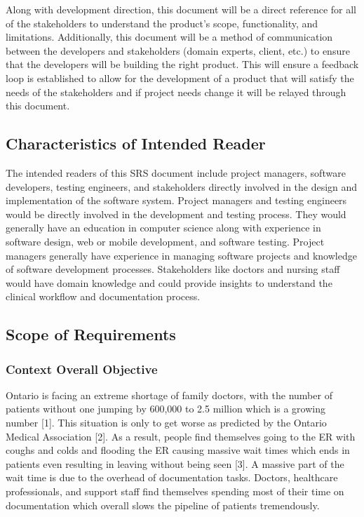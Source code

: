 \documentclass[12pt]{article}
\begin{document}
  Along with development direction, this document will be a direct reference for all of the stakeholders to understand the product's scope, functionality, and limitations. Additionally, this document will be a method of communication between the developers and stakeholders (domain experts, client, etc.) to ensure that the developers will be building the right product. This will ensure a feedback loop is established to allow for the development of a product that will satisfy the needs of the stakeholders and if project needs change it will be relayed through this document.


\subsection{Characteristics of Intended Reader} \label{sec_IntendedReader} 

The intended readers of this SRS document include project managers, software developers, testing engineers, and stakeholders directly involved in the design and implementation of the software system. Project managers and testing engineers would be directly involved in the development and testing process. They would generally have an education in computer science along with experience in software design, web or mobile development, and software testing. Project managers generally have experience in managing software projects and knowledge of software development processes. Stakeholders like doctors and nursing staff would have domain knowledge and could provide insights to understand the clinical workflow and documentation process. 

\subsection{Scope of Requirements} 


\subsubsection{Context Overall Objective}
Ontario is facing an extreme shortage of family doctors, with the number of
patients without one jumping by 600,000 to 2.5 million which is a growing
number [1]. This situation is only to get worse as predicted by the Ontario
Medical Association [2]. As a result, people find themselves going to the ER with
coughs and colds and flooding the ER causing massive wait times which ends in
patients even resulting in leaving without being seen [3]. A massive part of the
wait time is due to the overhead of documentation tasks. Doctors, healthcare
professionals, and support staff find themselves spending most of their time on
documentation which overall slows the pipeline of patients tremendously.
\end{document}
